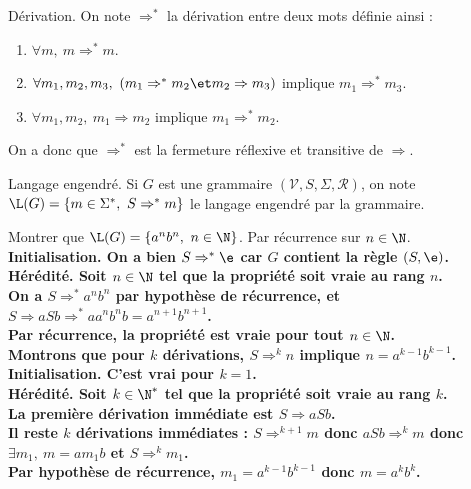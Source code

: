 \documentclass[french, 11pt]{article}
\renewcommand*{\S}{\Sigma}
\renewcommand*{\V}{\mathcal{V}}
\renewcommand*{\R}{\mathcal{R}}
\renewcommand*{\ra}{\Rightarrow}
\begin{document}
\vspace*{0.4cm}

\begin{defi}{Dérivation.}{}
    On note $\ra^*$ la dérivation entre deux mots définie ainsi :
    \begin{enumerate}
        \item $\forall m, ~ m \ra^* m$.
        \item $\forall m_1, m_2, m_3, ~ (m_1 \ra^* m_2 \et m_2\ra m_3)$ implique $m_1\ra^*m_3$.
        \item $\forall m_1, m_2, ~ m_1 \ra m_2$ implique $m_1 \ra^* m_2$.
    \end{enumerate}
    On a donc que $\ra^*$ est la fermeture réflexive et transitive de $\ra$.
\end{defi}

\vspace*{0.4cm}

\begin{defi}{Langage engendré.}{}
    Si $G$ est une grammaire $(\V,S,\S,\R)$, on note $\L(G)=\{m\in\S^*, ~ S \ra^* m\}$ le langage engendré par la grammaire.
\end{defi}

\vspace*{0.4cm}

\begin{ex}{}{}
    Montrer que $\L(G)=\{a^nb^n, ~ n \in \N\}$.
    \tcblower
    \boxed{\supset} Par récurrence sur $n\in\N$.\\
    \bf{Initialisation.} On a bien $S\ra^*\e$ car $G$ contient la règle $(S,\e)$.\\
    \bf{Hérédité.} Soit $n\in\N$ tel que la propriété soit vraie au rang $n$.\\
    On a $S\ra^*a^nb^n$ par hypothèse de récurrence, et $S\ra aSb \ra^* aa^nb^nb = a^{n+1}b^{n+1}$.\\
    Par récurrence, la propriété est vraie pour tout $n\in\N$.\\
    \boxed{\subset} Montrons que pour $k$ dérivations, $S\ra^kn$ implique $n=a^{k-1}b^{k-1}$.\\
    \bf{Initialisation.} C'est vrai pour $k=1$.\\
    \bf{Hérédité.} Soit $k\in\N^*$ tel que la propriété soit vraie au rang $k$.\\
    La première dérivation immédiate est $S\ra aSb$.\\
    Il reste $k$ dérivations immédiates : $S\ra^{k+1}m$ donc $aSb\ra^km$ donc $\exists m_1, ~ m = am_1b$ et $S\ra^km_1$.\\
    Par hypothèse de récurrence, $m_1=a^{k-1}b^{k-1}$ donc $m=a^kb^k$.
\end{ex}
\end{document}
